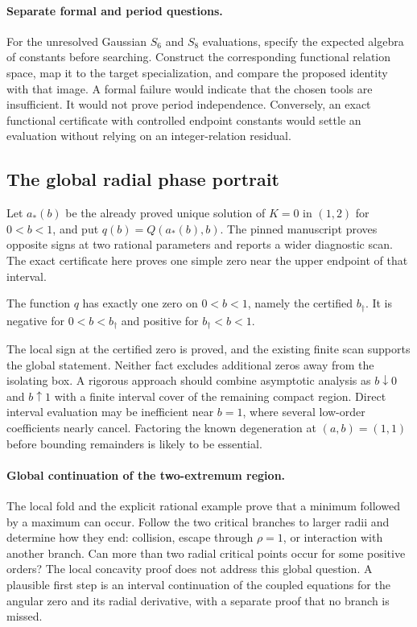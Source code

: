 \paragraph{Separate formal and period questions.}
For the unresolved Gaussian $S_6$ and $S_8$ evaluations,
specify the expected algebra of constants before searching.
Construct the corresponding functional relation space,
map it to the target specialization, and compare the proposed
identity with that image. A formal failure would indicate
that the chosen tools are insufficient. It would not prove
period independence. Conversely, an exact functional
certificate with controlled endpoint constants would settle
an evaluation without relying on an integer-relation residual.

\subsection{The global radial phase portrait}

Let $a_*(b)$ be the already proved unique solution of $K=0$
in $(1,2)$ for $0<b<1$, and put $q(b)=Q(a_*(b),b)$.
The pinned manuscript proves opposite signs at two rational
parameters and reports a wider diagnostic scan. The exact
certificate here proves one simple zero near the upper
endpoint of that interval.

\begin{conjecture}
\label{conj:quartic-global}
The function $q$ has exactly one zero on $0<b<1$, namely
the certified $b_\dagger$. It is negative for
$0<b<b_\dagger$ and positive for $b_\dagger<b<1$.
\end{conjecture}

The local sign at the certified zero is proved, and the
existing finite scan supports the global statement. Neither
fact excludes additional zeros away from the isolating box.
A rigorous approach should combine asymptotic analysis as
$b\downarrow0$ and $b\uparrow1$ with a finite interval cover
of the remaining compact region. Direct interval evaluation
may be inefficient near $b=1$, where several low-order
coefficients nearly cancel. Factoring the known degeneration
at $(a,b)=(1,1)$ before bounding remainders is likely to be
essential.

\paragraph{Global continuation of the two-extremum region.}
The local fold and the explicit rational example prove that
a minimum followed by a maximum can occur. Follow the two
critical branches to larger radii and determine how they
end: collision, escape through $\rho=1$, or interaction with
another branch. Can more than two radial critical points
occur for some positive orders? The local concavity proof
does not address this global question. A plausible first
step is an interval continuation of the coupled equations
for the angular zero and its radial derivative, with a
separate proof that no branch is missed.


